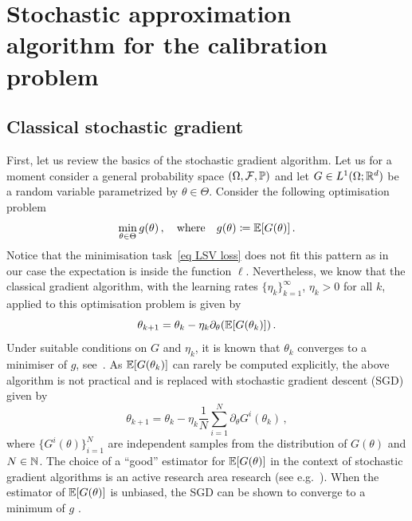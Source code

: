 
\section{Stochastic approximation algorithm for the calibration problem}\label{sec:sgd}


\subsection{Classical stochastic gradient}
First, let us review the basics of the stochastic gradient algorithm. 
Let us for a moment consider a general probability space $(\Omega, \mathcal{F}, \mathbb{P})$ and let $G\in L^1(\Omega; \mathbb{R}^d)$ be a random variable parametrized by $\theta\in \Theta$. 
Consider the following optimisation problem 
\[
\min_{\theta \in \Theta}g(\theta)\,,\quad\text{where}\quad g(\theta)\coloneqq \mathbb{E}[G(\theta)]\,.
\]
Notice that the minimisation task~\eqref{eq LSV loss} does not fit this pattern as in our case the expectation is inside the function $\ell$. Nevertheless, we know that the classical gradient algorithm, with the learning rates $\{\eta_k\}_{k=1}^{\infty}$, $\eta_k >0$ for all $k$, applied to this optimisation problem is given by
\[
\theta_{k+1} = \theta_k - \eta_k \partial_\theta (\mathbb{E}[G(\theta_k)])\,.
\]
Under suitable conditions on $G$ and $\eta_k$, it is known that $\theta_{k}$ converges to a minimiser of $g$, see~\cite{Benveniste2012AdaptiveApproximations}. 
As $\mathbb{E}[G(\theta_k)]$ can rarely be computed explicitly, the above algorithm is not practical and is replaced with stochastic gradient descent (SGD) given by
\[
\theta_{k+1} = \theta_k - \eta_k \frac{1}{N}\sum_{i=1}^{N} \partial_{\theta}G^i(\theta_k)\,,
\] 
where $\{G^i(\theta)\}_{i=1}^{N}$ are independent samples from the distribution of $G(\theta)$ and $N \in\mathbb{N}$. The choice of a ``good'' estimator for $\mathbb{E}[G(\theta)]$ in the context of stochastic gradient algorithms is an active research area research (see e.g.~\cite{Majka2023Multi-indexAlgorithm}). 
When the estimator of $\mathbb{E}[G(\theta)]$ is unbiased, the SGD can be shown to converge to a minimum of $g$ \cite{Benveniste2012AdaptiveApproximations}. 


